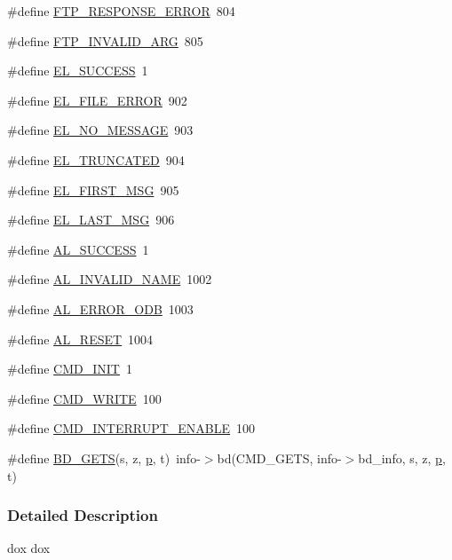 \begin{DoxyCompactItemize}
\#define \hyperlink{group__err26_ga7f2618f2babfbc3f2fbd27523c218a1e}{FTP\_\-RESPONSE\_\-ERROR}~804
\item 
\#define \hyperlink{group__err26_ga96fa3686e25d0b43ec2c504cc831551d}{FTP\_\-INVALID\_\-ARG}~805
\item 
\#define \hyperlink{group__err26_ga6d87830641fea1e7e72242c32acde1df}{EL\_\-SUCCESS}~1
\item 
\#define \hyperlink{group__err26_gae97067062620fe28d93670c390f23533}{EL\_\-FILE\_\-ERROR}~902
\item 
\#define \hyperlink{group__err26_ga92e31d92c7267ce163abeda53479cb0a}{EL\_\-NO\_\-MESSAGE}~903
\item 
\#define \hyperlink{group__err26_ga3e20cada0b5022911f56eb7c8b29b20b}{EL\_\-TRUNCATED}~904
\item 
\#define \hyperlink{group__err26_gaac4d08b2b3c0c6755a104864de2ec8f0}{EL\_\-FIRST\_\-MSG}~905
\item 
\#define \hyperlink{group__err26_ga5f11d9b4e829e2486252fef634b6a382}{EL\_\-LAST\_\-MSG}~906
\item 
\#define \hyperlink{group__err26_ga5bf38fa7fcb948150030918ced138deb}{AL\_\-SUCCESS}~1
\item 
\#define \hyperlink{group__err26_ga55849da05eeaa784af7a8b0969b6cab8}{AL\_\-INVALID\_\-NAME}~1002
\item 
\#define \hyperlink{group__err26_gae85455d8748ca9ad9c652365f4030178}{AL\_\-ERROR\_\-ODB}~1003
\item 
\#define \hyperlink{group__err26_ga6fb127cb253f60659e9356f9eeff2107}{AL\_\-RESET}~1004
\item 
\#define \hyperlink{group__err26_ga2677fc43f8393bcf3bafc8bbface003f}{CMD\_\-INIT}~1
\item 
\#define \hyperlink{group__err26_ga7391deb9c3a262ded3e186e94eb884e2}{CMD\_\-WRITE}~100
\item 
\#define \hyperlink{group__err26_gaab5043b2fd69a86d3bcecfb3fd8f7af3}{CMD\_\-INTERRUPT\_\-ENABLE}~100
\item 
\#define \hyperlink{group__err26_ga834400e6d1a88da1ea5e83b5e50675af}{BD\_\-GETS}(s, z, \hyperlink{sis3803_8c_afcb0609a0beab248bb3994a3368bd9ff}{p}, t)~info-\/$>$bd(CMD\_\-GETS, info-\/$>$bd\_\-info, s, z, \hyperlink{sis3803_8c_afcb0609a0beab248bb3994a3368bd9ff}{p}, t)
\end{DoxyCompactItemize}


\subsubsection{Detailed Description}
dox dox 

